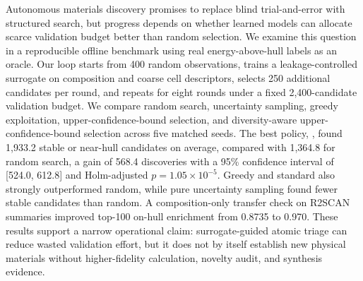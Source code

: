 Autonomous materials discovery promises to replace blind trial-and-error with structured search, but progress depends on whether learned models can allocate scarce validation budget better than random selection. We examine this question in a reproducible offline benchmark using real \mpdata energy-above-hull labels as an oracle. Our loop starts from 400 random observations, trains a leakage-controlled \mlp surrogate on composition and coarse cell descriptors, selects 250 additional candidates per round, and repeats for eight rounds under a fixed 2,400-candidate validation budget. We compare random search, uncertainty sampling, greedy exploitation, upper-confidence-bound selection, and diversity-aware upper-confidence-bound selection across five matched seeds. The best policy, \diverseucb, found 1,933.2 stable or near-hull candidates on average, compared with 1,364.8 for random search, a gain of 568.4 discoveries with a 95\% confidence interval of [524.0, 612.8] and Holm-adjusted $p=1.05 \times 10^{-5}$. Greedy and standard \ucb also strongly outperformed random, while pure uncertainty sampling found fewer stable candidates than random. A composition-only transfer check on \gnome R2SCAN summaries improved top-100 on-hull enrichment from 0.8735 to 0.970. These results support a narrow operational claim: surrogate-guided atomic triage can reduce wasted validation effort, but it does not by itself establish new physical materials without higher-fidelity calculation, novelty audit, and synthesis evidence.
